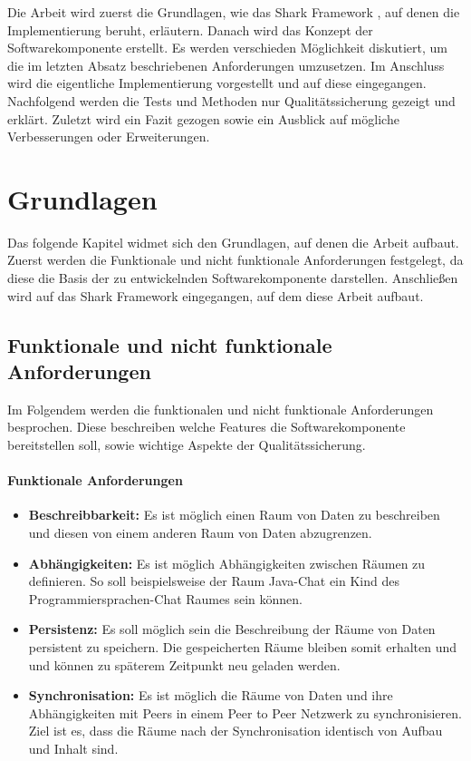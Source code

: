 \documentclass[a4paper]{article}
\begin{document}
	Die Arbeit wird zuerst die Grundlagen, wie das Shark Framework \cite{SharkFW},
	auf denen die Implementierung beruht, erläutern. Danach wird das Konzept
	der Softwarekomponente erstellt. Es werden verschieden Möglichkeit
	diskutiert, um die im letzten Absatz beschriebenen Anforderungen umzusetzen.
	Im Anschluss wird die eigentliche Implementierung vorgestellt und auf
	diese eingegangen. Nachfolgend werden die Tests und Methoden nur
	Qualitätssicherung gezeigt und erklärt. Zuletzt wird ein Fazit gezogen
	sowie ein Ausblick auf mögliche Verbesserungen oder Erweiterungen.

	\newpage
	
	\section{Grundlagen}
	
	Das folgende Kapitel widmet sich den Grundlagen, auf denen die Arbeit
	aufbaut. Zuerst werden die Funktionale und nicht funktionale Anforderungen
	festgelegt, da diese die Basis der zu entwickelnden Softwarekomponente
	darstellen. Anschließen wird auf das Shark Framework eingegangen, auf dem
	diese Arbeit aufbaut.	
	
	\subsection{Funktionale und nicht funktionale Anforderungen}
	
	Im Folgendem werden die funktionalen und nicht funktionale
	Anforderungen besprochen. Diese	beschreiben welche Features die
	Softwarekomponente bereitstellen soll, sowie wichtige Aspekte der
	Qualitätssicherung.
	
	\paragraph{Funktionale Anforderungen}
	\begin{itemize}
		\item \textbf{Beschreibbarkeit:} Es ist möglich einen Raum von
		Daten zu beschreiben und diesen von einem anderen Raum
		von Daten abzugrenzen. 
		\item \textbf{Abhängigkeiten:} Es ist möglich Abhängigkeiten zwischen
		Räumen zu definieren. So soll beispielsweise der Raum Java-Chat ein 
		Kind des Programmiersprachen-Chat Raumes sein können.
		\item \textbf{Persistenz:} Es soll möglich sein die Beschreibung der
		Räume von Daten persistent zu speichern. Die gespeicherten Räume
		bleiben somit erhalten und und können zu späterem Zeitpunkt neu
		geladen werden.
		\item \textbf{Synchronisation:} Es ist möglich die Räume von Daten 
		und ihre Abhängigkeiten mit Peers in einem Peer to Peer Netzwerk 
		zu synchronisieren. Ziel ist es, dass die Räume nach der 
		Synchronisation identisch von Aufbau und Inhalt sind.
	\end{itemize} 	
	
\end{document}
